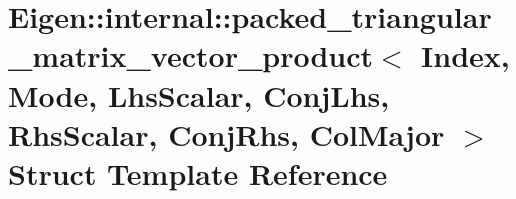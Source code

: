 \hypertarget{struct_eigen_1_1internal_1_1packed__triangular__matrix__vector__product_3_01_index_00_01_mode_00bec3a0963b0a27d1079bfcbb3d0202cf}{}\section{Eigen\+:\+:internal\+:\+:packed\+\_\+triangular\+\_\+matrix\+\_\+vector\+\_\+product$<$ Index, Mode, Lhs\+Scalar, Conj\+Lhs, Rhs\+Scalar, Conj\+Rhs, Col\+Major $>$ Struct Template Reference}
\label{struct_eigen_1_1internal_1_1packed__triangular__matrix__vector__product_3_01_index_00_01_mode_00bec3a0963b0a27d1079bfcbb3d0202cf}
